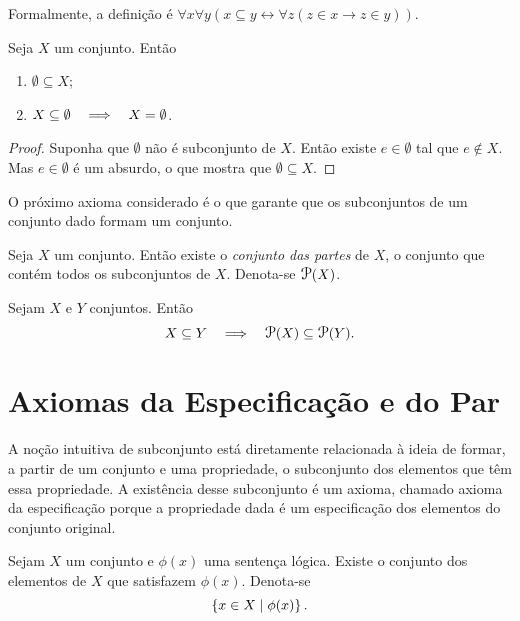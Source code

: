 Formalmente, a definição é $\forall x \forall y (x \subseteq y \leftrightarrow \forall z (z \in x \rightarrow z \in y))$. 

\begin{prop}
Seja $X$ um conjunto. Então
	\begin{enumerate}
	\item $\emptyset \subseteq X$;
	\item $X \subseteq \emptyset \quad \Longrightarrow \quad X=\emptyset$.
	\end{enumerate}
\end{prop}
\begin{proof}
Suponha que $\emptyset$ não é subconjunto de $X$. Então existe $e \in \emptyset$ tal que $e \notin X$. Mas $e \in \emptyset$ é um absurdo, o que mostra que $\emptyset \subseteq X$.
\end{proof}

O próximo axioma considerado é o que garante que os subconjuntos de um conjunto dado formam um conjunto.

\begin{axi}[Partes]
Seja $X$ um conjunto. Então existe o \emph{conjunto das partes} de $X$, o conjunto que contém todos os subconjuntos de $X$. Denota-se $\p(X)$.
\end{axi}

\begin{prop}
Sejam $X$ e $Y$ conjuntos. Então
	\begin{equation*}
	X \subseteq Y \entao \p(X) \subseteq \p(Y).
	\end{equation*}
\end{prop}

\section{Axiomas da Especificação e do Par}

A noção intuitiva de subconjunto está diretamente relacionada à ideia de formar, a partir de um conjunto e uma propriedade, o subconjunto dos elementos que têm essa propriedade. A existência desse subconjunto é um axioma, chamado axioma da especificação porque a propriedade dada é um especificação dos elementos do conjunto original.

\begin{axi}[Especificação]
Sejam $X$ um conjunto e $\phi(x)$ uma sentença lógica. Existe o conjunto dos elementos de $X$ que satisfazem $\phi(x)$. Denota-se
	\begin{equation*}
	\left\{x \in X \;\middle\vert\; \phi(x) \right\}.
	\end{equation*}
\end{axi}

